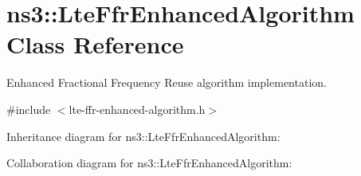 \hypertarget{classns3_1_1LteFfrEnhancedAlgorithm}{}\section{ns3\+:\+:Lte\+Ffr\+Enhanced\+Algorithm Class Reference}
\label{classns3_1_1LteFfrEnhancedAlgorithm}


Enhanced Fractional Frequency Reuse algorithm implementation.  




{\ttfamily \#include $<$lte-\/ffr-\/enhanced-\/algorithm.\+h$>$}



Inheritance diagram for ns3\+:\+:Lte\+Ffr\+Enhanced\+Algorithm\+:


Collaboration diagram for ns3\+:\+:Lte\+Ffr\+Enhanced\+Algorithm\+:
